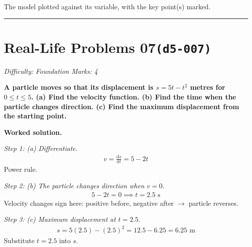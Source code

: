 \documentclass[11pt]{article}
\newcommand{\question}[1]{\par\medskip\noindent\textbf{#1}\par}
\begin{document}
\begin{center}
{
}
\end{center}
\small The model plotted against its variable, with the key point(s) marked.\normalsize

\medskip\hrule

\section*{Real-Life Problems 07\quad\small\texttt{(d5-007)}}
\textit{Difficulty: Foundation \quad\textbar\quad Marks: 4}

\question{A particle moves so that its displacement is \( s = 5t - t^2 \) metres for \( 0 \leq t \leq 5 \). (a) Find the velocity function. (b) Find the time when the particle changes direction. (c) Find the maximum displacement from the starting point.}

\textbf{Worked solution.}

\textit{Step 1: (a) Differentiate.}
\[\begin{gathered}
v = \frac{\mathrm{d}s}{\mathrm{d}t} = 5 - 2t
\end{gathered}\]
Power rule.

\textit{Step 2: (b) The particle changes direction when \( v = 0 \).}
\[\begin{gathered}
5 - 2t = 0 \implies t = 2.5 \text{ s}
\end{gathered}\]
Velocity changes sign here: positive before, negative after $\to$ particle reverses.

\textit{Step 3: (c) Maximum displacement at \( t = 2.5 \).}
\[\begin{gathered}
s = 5(2.5) - (2.5)^2 = 12.5 - 6.25 = 6.25 \text{ m}
\end{gathered}\]
Substitute \( t = 2.5 \) into \( s \).
\end{document}
